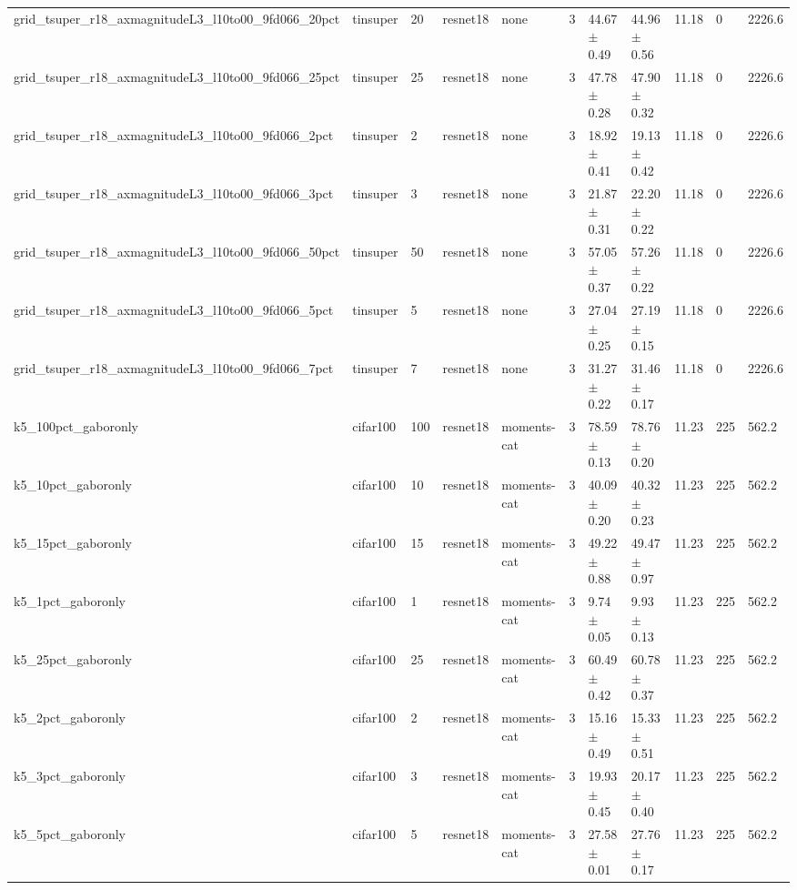 \begin{tabular}{lllllllllll}
grid_tsuper_r18_axmagnitudeL3_l10to00_9fd066_20pct & tinsuper & 20 & resnet18 & none & 3 & 44.67 $\pm$ 0.49 & 44.96 $\pm$ 0.56 & 11.18 & 0 & 2226.6 \\
grid_tsuper_r18_axmagnitudeL3_l10to00_9fd066_25pct & tinsuper & 25 & resnet18 & none & 3 & 47.78 $\pm$ 0.28 & 47.90 $\pm$ 0.32 & 11.18 & 0 & 2226.6 \\
grid_tsuper_r18_axmagnitudeL3_l10to00_9fd066_2pct & tinsuper & 2 & resnet18 & none & 3 & 18.92 $\pm$ 0.41 & 19.13 $\pm$ 0.42 & 11.18 & 0 & 2226.6 \\
grid_tsuper_r18_axmagnitudeL3_l10to00_9fd066_3pct & tinsuper & 3 & resnet18 & none & 3 & 21.87 $\pm$ 0.31 & 22.20 $\pm$ 0.22 & 11.18 & 0 & 2226.6 \\
grid_tsuper_r18_axmagnitudeL3_l10to00_9fd066_50pct & tinsuper & 50 & resnet18 & none & 3 & 57.05 $\pm$ 0.37 & 57.26 $\pm$ 0.22 & 11.18 & 0 & 2226.6 \\
grid_tsuper_r18_axmagnitudeL3_l10to00_9fd066_5pct & tinsuper & 5 & resnet18 & none & 3 & 27.04 $\pm$ 0.25 & 27.19 $\pm$ 0.15 & 11.18 & 0 & 2226.6 \\
grid_tsuper_r18_axmagnitudeL3_l10to00_9fd066_7pct & tinsuper & 7 & resnet18 & none & 3 & 31.27 $\pm$ 0.22 & 31.46 $\pm$ 0.17 & 11.18 & 0 & 2226.6 \\
k5_100pct_gaboronly & cifar100 & 100 & resnet18 & moments-cat & 3 & 78.59 $\pm$ 0.13 & 78.76 $\pm$ 0.20 & 11.23 & 225 & 562.2 \\
k5_10pct_gaboronly & cifar100 & 10 & resnet18 & moments-cat & 3 & 40.09 $\pm$ 0.20 & 40.32 $\pm$ 0.23 & 11.23 & 225 & 562.2 \\
k5_15pct_gaboronly & cifar100 & 15 & resnet18 & moments-cat & 3 & 49.22 $\pm$ 0.88 & 49.47 $\pm$ 0.97 & 11.23 & 225 & 562.2 \\
k5_1pct_gaboronly & cifar100 & 1 & resnet18 & moments-cat & 3 & 9.74 $\pm$ 0.05 & 9.93 $\pm$ 0.13 & 11.23 & 225 & 562.2 \\
k5_25pct_gaboronly & cifar100 & 25 & resnet18 & moments-cat & 3 & 60.49 $\pm$ 0.42 & 60.78 $\pm$ 0.37 & 11.23 & 225 & 562.2 \\
k5_2pct_gaboronly & cifar100 & 2 & resnet18 & moments-cat & 3 & 15.16 $\pm$ 0.49 & 15.33 $\pm$ 0.51 & 11.23 & 225 & 562.2 \\
k5_3pct_gaboronly & cifar100 & 3 & resnet18 & moments-cat & 3 & 19.93 $\pm$ 0.45 & 20.17 $\pm$ 0.40 & 11.23 & 225 & 562.2 \\
k5_5pct_gaboronly & cifar100 & 5 & resnet18 & moments-cat & 3 & 27.58 $\pm$ 0.01 & 27.76 $\pm$ 0.17 & 11.23 & 225 & 562.2 \\

\end{tabular}
